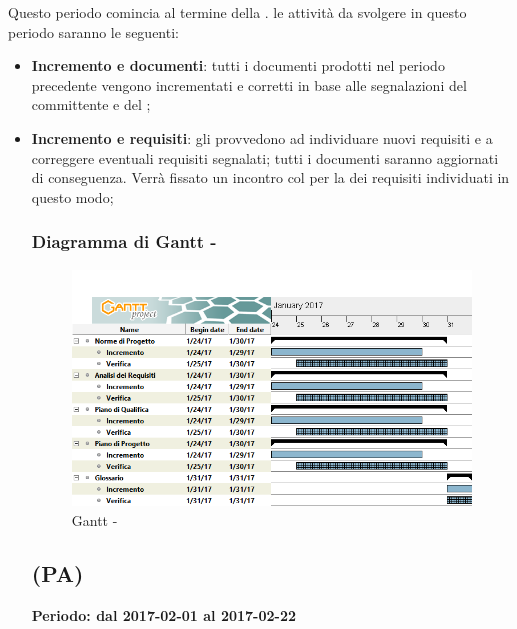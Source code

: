 \documentclass[./PianoDiProgetto.tex]{subfiles}
\begin{document}
  Questo periodo comincia al termine della \PerAR.  le attività da svolgere in questo periodo saranno le seguenti:
  \begin{itemize}
    \item \textbf{Incremento e  documenti}: tutti i documenti prodotti nel periodo precedente vengono incrementati e corretti in base alle segnalazioni del committente e del ;
    \item \textbf{Incremento e  requisiti}:  gli \ANP{} provvedono ad individuare nuovi requisiti e a correggere eventuali requisiti segnalati; tutti i documenti saranno aggiornati di conseguenza. Verrà fissato un incontro col  per la  dei requisiti individuati in questo modo;
  \newpage
  \subsubsection{Diagramma di Gantt - \PerAD}
    \begin{figure}[!h]
    \centering
    \includegraphics[width=\textwidth]{images/AD}
    \caption{Gantt - \PerAD}
    \end{figure}

  \subsection{\PerPA{} (PA)}
  \textbf{Periodo: dal 2017-02-01 al 2017-02-22}


\end{itemize}
\end{document}
